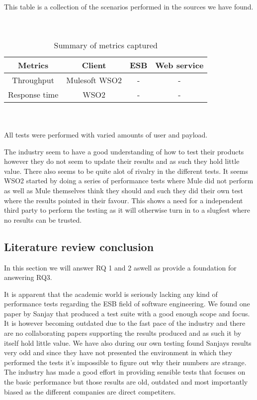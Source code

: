 \begin{table}[H]
	This table is a collection of the scenarios performed in the sources we have found. 
	\\
	\\
	\\	
	\caption{Summary of metrics captured}
	\begin{tabular}{c c c c}
	Metrics &  Client & ESB & Web service \\
	\hline
	Throughput & Mulesoft \cite{mulesoft08} WSO2 \cite{Perera07R2,Perera07R3} & - & - \\
	Response time & WSO2 \cite{Perera07} & - & - \\
	\hline
	\end{tabular}
	\\
	\\
	All tests were performed with varied amounts of user and payload.
\end{table}

The industry seem to have a good understanding of how to test their products however they do not seem to update their results and as such they hold little value.
There also seems to be quite alot of rivalry in the different tests. 
It seems WSO2 started by doing a series of performance tests \cite{Perera07,Perera07R2,Perera07R3}  where Mule did not perform as well as Mule themselves think they should and such they did their own test \cite{mulesoft08} where the results pointed in their favour.
This shows a need for a independent third party to perform the testing as it will otherwise turn in to a slugfest where no results can be trusted. 

\subsection{Literature review conclusion}
In this section we will answer RQ 1 and 2 aswell as provide a foundation for answering RQ3.

It is apparent that the academic world is seriously lacking any kind of performance tests regarding the ESB field of software engineering. 
We found one paper by Sanjay \cite{Sanjay2011} that produced a test suite with a good enough scope and focus. 
It is however becoming outdated due to the fast pace of the industry and there are no collaborating papers supporting the results produced and as such it by itself hold little value. 
We have also during our own testing found Sanjays results very odd and since they have not presented the environment in which they performed the tests it's impossible to figure out why their numbers are strange. 
The industry has made a good effort in providing sensible tests that focuses on the basic performance but those results are old, outdated and most importantly biased as the different companies are direct competiters. 

